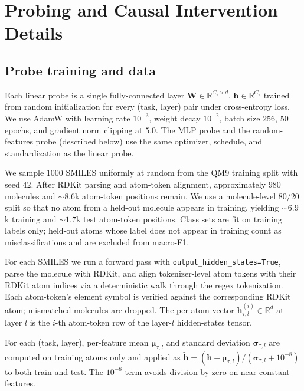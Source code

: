 \section{Probing and Causal Intervention Details}
\label{app:training}
\label{app:mlp}
\label{app:random}
\label{app:steering}

\subsection{Probe training and data}

 Each linear probe is a single fully-connected layer $\mathbf{W}\in\mathbb{R}^{C_\tau \times d}$, $\mathbf{b}\in\mathbb{R}^{C_\tau}$ trained from random initialization for every (task, layer) pair under cross-entropy loss. We use AdamW with learning rate $10^{-3}$, weight decay $10^{-2}$, batch size $256$, $50$ epochs, and gradient norm clipping at $5.0$. The MLP probe and the random-features probe (described below) use the same optimizer, schedule, and standardization as the linear probe.

 We sample $1000$ SMILES uniformly at random from the QM9 training split with seed $42$. After RDKit parsing and atom-token alignment, approximately $980$ molecules and $\sim 8.6$k atom-token positions remain. We use a molecule-level $80/20$ split so that no atom from a held-out molecule appears in training, yielding $\sim 6.9$k training and $\sim 1.7$k test atom-token positions. Class sets are fit on training labels only; held-out atoms whose label does not appear in training count as misclassifications and are excluded from macro-F1.

 For each SMILES we run a forward pass with \texttt{output\_hidden\_states=True}, parse the molecule with RDKit, and align tokenizer-level atom tokens with their RDKit atom indices via a deterministic walk through the regex tokenization. Each atom-token's element symbol is verified against the corresponding RDKit atom; mismatched molecules are dropped. The per-atom vector $\mathbf{h}^{(i)}_{\tau, l} \in \mathbb{R}^{d}$ at layer $l$ is the $i$-th atom-token row of the layer-$l$ hidden-states tensor.

 For each (task, layer), per-feature mean $\boldsymbol{\mu}_{\tau, l}$ and standard deviation $\boldsymbol{\sigma}_{\tau, l}$ are computed on training atoms only and applied as $\tilde{\mathbf{h}} = (\mathbf{h} - \boldsymbol{\mu}_{\tau, l}) / (\boldsymbol{\sigma}_{\tau, l} + 10^{-8})$ to both train and test. The $10^{-8}$ term avoids division by zero on near-constant features.

